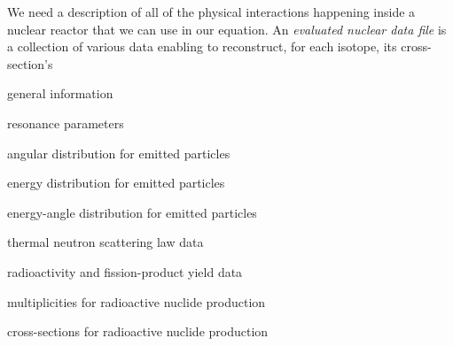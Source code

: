 \documentclass[12pt]{article}
\begin{document}
We need a description of all of the physical interactions happening inside a nuclear reactor that we can use in our equation. An \textit{evaluated nuclear data file} is a collection of various data enabling to reconstruct, for each isotope, its cross-section's 
\begin{compactitem}
\item general information
\item resonance parameters 
\item angular distribution for emitted particles 
\item energy distribution for emitted particles 
\item energy-angle distribution for emitted particles 
\item thermal neutron scattering law data 
\item radioactivity and fission-product yield data 
\item multiplicities for radioactive nuclide production 
\item cross-sections for radioactive nuclide production
\end{compactitem}
\end{document}
